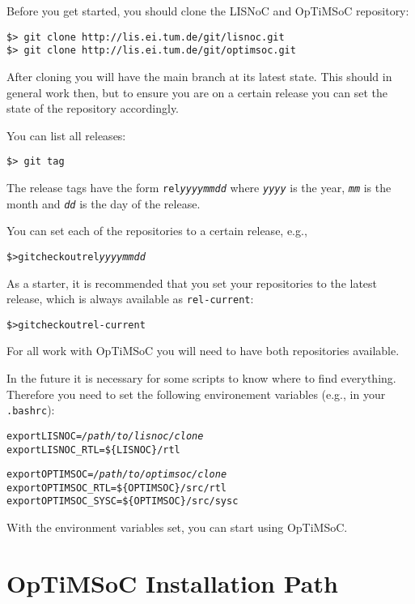 Before you get started, you should clone the LISNoC and OpTiMSoC
repository:

\begin{verbatim}
$> git clone http://lis.ei.tum.de/git/lisnoc.git
$> git clone http://lis.ei.tum.de/git/optimsoc.git
\end{verbatim}

After cloning you will have the main branch at its latest state. This
should in general work then, but to ensure you are on a certain
release you can set the state of the repository accordingly.

You can list all releases:

\begin{verbatim}
$> git tag
\end{verbatim}

The release tags have the form \texttt{rel\emph{yyyymmdd}} where
\texttt{\emph{yyyy}} is the year, \texttt{\emph{mm}} is the month and
\texttt{\emph{dd}} is the day of the release.

You can set each of the repositories to a certain release, e.g.,

\begin{alltt}
\$> git checkout rel\emph{yyyymmdd}
\end{alltt}

As a starter, it is recommended that you set your repositories to the
latest release, which is always available as \texttt{rel-current}:

\begin{alltt}
\$> git checkout rel-current
\end{alltt}

For all work with OpTiMSoC you will need to have both repositories
available.

In the future it is necessary for some scripts to know where to find
everything. Therefore you need to set the following environement
variables (e.g., in your \verb|.bashrc|):

\begin{alltt}
export LISNOC=\emph{/path/to/lisnoc/clone}
export LISNOC_RTL=\$\{LISNOC\}/rtl

export OPTIMSOC=\emph{/path/to/optimsoc/clone}
export OPTIMSOC_RTL=\$\{OPTIMSOC\}/src/rtl
export OPTIMSOC_SYSC=\$\{OPTIMSOC\}/src/sysc
\end{alltt}

With the environment variables set, you can start using OpTiMSoC.

\section{OpTiMSoC Installation Path}

